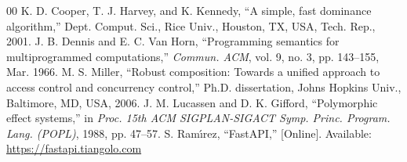 \documentclass[conference]{IEEEtran}
\begin{document}
\begin{thebibliography}{00}
 K. D. Cooper, T. J. Harvey, and K. Kennedy, ``A simple, fast dominance algorithm,'' Dept. Comput. Sci., Rice Univ., Houston, TX, USA, Tech. Rep., 2001.
 J. B. Dennis and E. C. Van Horn, ``Programming semantics for multiprogrammed computations,'' \emph{Commun. ACM}, vol. 9, no. 3, pp. 143--155, Mar. 1966.
 M. S. Miller, ``Robust composition: Towards a unified approach to access control and concurrency control,'' Ph.D. dissertation, Johns Hopkins Univ., Baltimore, MD, USA, 2006.
 J. M. Lucassen and D. K. Gifford, ``Polymorphic effect systems,'' in \emph{Proc. 15th ACM SIGPLAN-SIGACT Symp. Princ. Program. Lang. (POPL)}, 1988, pp. 47--57.
 S. Ram\'{\i}rez, ``FastAPI,'' [Online]. Available: \url{https://fastapi.tiangolo.com}
\end{thebibliography}
\end{document}
